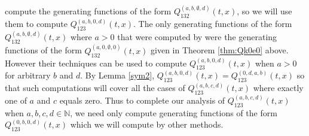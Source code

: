 \documentclass[
final,nomarks
]{dmtcs-episciences}
\begin{document}
compute the generating functions of the form \begin{math}Q_{132}^{(a, b, \emptyset, d)}(t,x)\end{math}, so we will use them to compute \begin{math}Q_{123}^{(a,b, 0, d)}(t,x)\end{math}.  The only generating functions 
of the form \begin{math}Q_{132}^{(a,b, \emptyset, d)}(t,x)\end{math} where \begin{math}a > 0\end{math} that were computed by 
\cite{KRT1,KRT2,KRT3} were the generating functions of the form 
\begin{math}Q_{132}^{(a, 0, \emptyset, 0)}(t,x)\end{math}  given in Theorem \ref{thm:Qk0e0} above. However 
their techniques can be used to compute \begin{math}Q_{123}^{(a, b, 0, d)}(t,x)\end{math} when \begin{math}a > 0\end{math} for 
arbitrary \begin{math}b\end{math} and \begin{math}d\end{math}. By Lemma \ref{sym2}, 
\begin{math}Q_{123}^{(a,b, 0, d)}(t,x) =  Q_{123}^{(0, d, a, b)}(t,x)\end{math} so 
that such computations will cover all the cases of \begin{math}Q_{123}^{(a,b,c,d)}(t,x)\end{math} where 
exactly one of \begin{math}a\end{math} and \begin{math}c\end{math} equals zero. Thus to complete our analysis of \begin{math}Q_{123}^{(a,b,c,d)}(t,x)\end{math} when \begin{math}a,b,c,d \in \mathbb{N}\end{math}, we need only compute generating functions of the form 
\begin{math}Q_{123}^{(0,b,0,d)}(t,x)\end{math} which we will compute by other methods.
\end{document}
